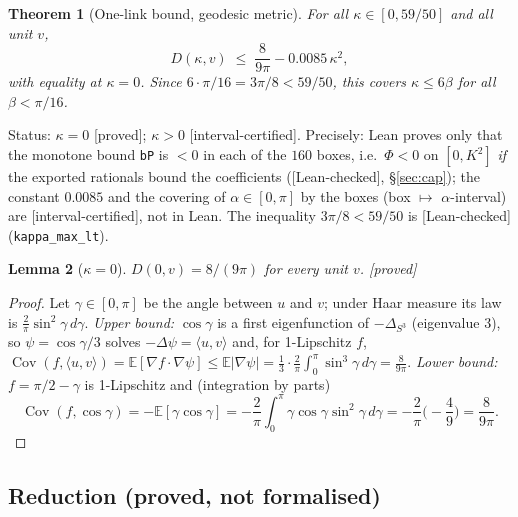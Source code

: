 \documentclass[11pt,a4paper]{article}
\newtheorem{theorem}{Theorem}
\newtheorem{lemma}[theorem]{Lemma}
\theoremstyle{remark}
\theoremstyle{definition}
\newcommand{\E}{\mathbb{E}}
\newcommand{\Cov}{\operatorname{Cov}}
\newcommand{\st}[1]{\textsf{[#1]}}
\begin{document}
\begin{theorem}[One-link bound, geodesic metric]\label{thm:onelink}
For all $\kappa\in[0,59/50]$ and all unit $v$,
\[
D(\kappa,v)\;\le\;\frac{8}{9\pi}-0.0085\,\kappa^2 ,
\]
with equality at $\kappa=0$. Since $6\cdot\pi/16=3\pi/8<59/50$, this covers $\kappa\le6\beta$ for all
$\beta<\pi/16$.
\end{theorem}
\noindent Status: $\kappa=0$ \st{proved}; $\kappa>0$ \st{interval-certified}. Precisely: Lean proves only
that the monotone bound \texttt{bP} is $<0$ in each of the $160$ boxes, i.e.\ $\Phi<0$ on $[0,K^2]$
\emph{if} the exported rationals bound the coefficients (\st{Lean-checked}, \S\ref{sec:cap}); the
constant $0.0085$ and the covering of $\alpha\in[0,\pi]$ by the boxes (box $\mapsto$ $\alpha$-interval) are
\st{interval-certified}, not in Lean. The inequality $3\pi/8<59/50$ is \st{Lean-checked}
(\texttt{kappa\_max\_lt}).

\begin{lemma}[$\kappa=0$]\label{lem:zero}
$D(0,v)=8/(9\pi)$ for every unit $v$. \st{proved}
\end{lemma}
\begin{proof}
Let $\gamma\in[0,\pi]$ be the angle between $u$ and $v$; under Haar measure its law is
$\frac2\pi\sin^2\gamma\,d\gamma$. \emph{Upper bound:} $\cos\gamma$ is a first eigenfunction of
$-\Delta_{S^3}$ (eigenvalue $3$), so $\psi=\cos\gamma/3$ solves $-\Delta\psi=\langle u,v\rangle$ and, for
1-Lipschitz $f$, $\Cov(f,\langle u,v\rangle)=\E[\nabla f\cdot\nabla\psi]\le\E|\nabla\psi|
=\frac13\cdot\frac2\pi\int_0^\pi\sin^3\gamma\,d\gamma=\frac{8}{9\pi}$.
\emph{Lower bound:} $f=\pi/2-\gamma$ is 1-Lipschitz and (integration by parts)
\[
\Cov(f,\cos\gamma)=-\E[\gamma\cos\gamma]=-\frac2\pi\int_0^\pi\gamma\cos\gamma\sin^2\gamma\,d\gamma
=-\frac2\pi\Big(-\frac49\Big)=\frac{8}{9\pi}.
\]
\end{proof}

\subsection{Reduction (proved, not formalised)}\label{sec:reduction}
\end{document}
